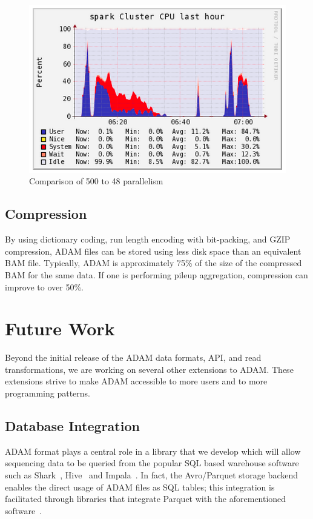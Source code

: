 \documentclass[10pt,twocolumn]{article}
\theoremstyle{plain}
\begin{document}
\begin{figure}[h]
\begin{center}
\includegraphics[width=0.9\linewidth]{images/Ganglia CPU Graph.png}
\end{center}
\caption{Comparison of 500 to 48 parallelism}
\label{fig:parallelism}
\end{figure}

\subsection{Compression}
\label{sec:compression}

By using dictionary coding, run length encoding with bit-packing, and GZIP compression, ADAM files can be stored using less
disk space than an equivalent BAM file. Typically, ADAM is approximately 75\% of the size of the compressed BAM for the
same data. If one is performing pileup aggregation, compression can improve to over 50\%.

\section{Future Work}
\label{sec:future-work}

Beyond the initial release of the ADAM data formats, API, and read transformations, we are working on several other
extensions to ADAM. These extensions strive to make ADAM accessible to more users and to more programming patterns.

\subsection{Database Integration}
\label{sec:database-integration}

ADAM format plays a central role in a library that we develop which will allow sequencing data to be queried from 
the popular SQL based warehouse software such as Shark~\cite{shark}, Hive~\cite{hive} and Impala~\cite{impala}. In fact,
the Avro/Parquet storage backend enables the direct usage of ADAM files as SQL tables; this integration is facilitated through libraries 
that integrate Parquet with the aforementioned software~\cite{parquet}.
\end{document}
